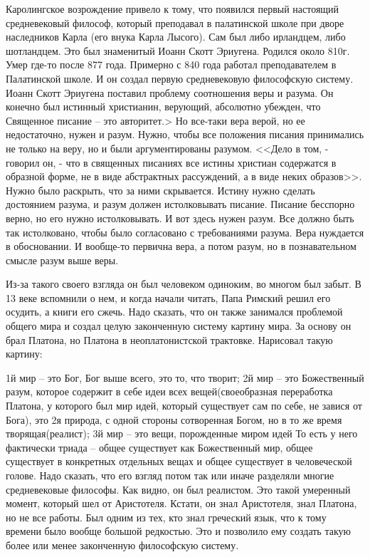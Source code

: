 Каролингское возрождение привело к тому, что появился первый настоящий средневековый философ, который преподавал в палатинской школе при дворе наследников Карла (его внука Карла Лысого). Сам был либо ирландцем, либо шотландцем. Это был знаменитый Иоанн Скотт Эриугена. Родился около 810г. Умер где-то после 877 года. Примерно с 840 года работал преподавателем в Палатинской школе. И он создал первую средневековую философскую систему. Иоанн Скотт Эриугена поставил проблему соотношения веры и разума. Он конечно был истинный христианин, верующий, абсолютно убежден, что Священное писание – это авторитет.> Но все-таки вера верой, но ее недостаточно, нужен и разум. Нужно, чтобы все положения писания принимались не только на веру, но и были аргументированы разумом. <<Дело в том, - говорил он, - что в священных писаниях все истины христиан содержатся в образной форме, не в виде абстрактных рассуждений, а в виде неких образов>>. Нужно было раскрыть, что за ними скрывается. Истину нужно сделать достоянием разума, и разум должен истолковывать писание. Писание бесспорно верно, но его нужно истолковывать. И вот здесь нужен разум. Все должно быть так истолковано, чтобы было согласовано с требованиями разума. Вера нуждается в обосновании. И вообще-то первична вера, а потом разум, но в познавательном смысле разум выше веры.

Из-за такого своего взгляда он был человеком одиноким, во многом был забыт. В 13 веке вспомнили о нем, и когда начали читать, Папа Римский решил его осудить, а книги его сжечь. Надо сказать, что он также занимался проблемой общего мира и создал целую законченную систему картину мира. За основу он брал Платона, но Платона в неоплатонистской трактовке. Нарисовал такую картину:

    1й мир – это Бог, Бог выше всего, это то, что творит; 2й мир – это Божественный разум, которое содержит в себе идеи всех вещей(своеобразная переработка Платона, у которого был мир идей, который существует сам по себе, не завися от Бога), это 2я природа, с одной стороны сотворенная Богом, но в то же время творящая(реалист); 3й мир – это вещи, порожденные миром идей То есть у него фактически триада – общее существует как Божественный мир, общее существует в конкретных отдельных вещах и общее существует в человеческой голове. Надо сказать, что его взгляд потом так или иначе разделяли многие средневековые философы. Как видно, он был реалистом. Это такой умеренный момент, который шел от Аристотеля. Кстати, он знал Аристотеля, знал Платона, но не все работы. Был одним из тех, кто знал греческий язык, что к тому времени было вообще большой редкостью. Это и позволило ему создать такую более или менее законченную философскую систему.

